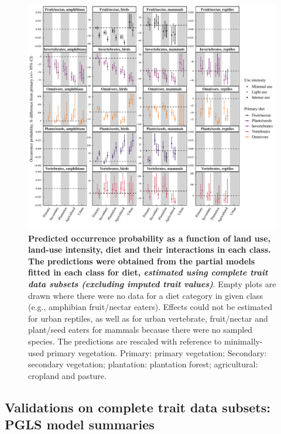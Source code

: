 \documentclass[11pt]{article}
\begin{document}
\begin{figure}[h!]
\centering
\includegraphics[scale=0.65]{Figures/Partial_models_predictions/Validations/Diet}
\caption[]{\textbf{Predicted occurrence probability as a function of land use, land-use intensity, diet and their interactions in each class. The predictions were obtained from the partial models fitted in each class for diet, \textit{estimated using complete trait data subsets (excluding imputed trait values)}}. Empty plots are drawn where there were no data for a diet category in  given class (e.g., amphibian fruit/nectar eaters). Effects could not be estimated for urban reptiles, as well as for urban vertebrate, fruit/nectar and plant/seed eaters for mammals because there were no sampled species. The predictions are rescaled with reference to minimally-used primary vegetation. Primary: primary vegetation; Secondary: secondary vegetation; plantation: plantation forest; agricultural: cropland and pasture.}
\label{}
\end{figure}


\clearpage

\subsection{Validations on complete trait data subsets: PGLS model summaries}

\end{document}
